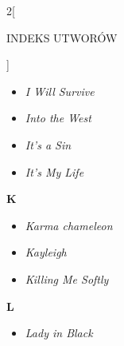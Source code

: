 \documentclass[a4paper]{report}
\begin{document}
\begin{multicols*}{2}[\begin{Huge}INDEKS UTWORÓW\end{Huge}\vspace{1cm}]
\begin{minipage}{\columnwidth}
\begin{itemize}[topsep=6pt, after=\vspace{1.5mm}, leftmargin=0mm]
		\itemsep0em
		\item[]  \textit{I Will Survive}  \\
	\end{itemize}
\end{minipage}
\begin{minipage}{\columnwidth}
	\begin{itemize}[topsep=6pt, after=\vspace{1.5mm}, leftmargin=0mm]
		\itemsep0em
		\item[]  \textit{Into the West}  \\
	\end{itemize}
\end{minipage}
\begin{minipage}{\columnwidth}
	\begin{itemize}[topsep=6pt, after=\vspace{5mm}, leftmargin=0mm]
		\itemsep0em
		\item[]  \textit{It's a Sin}  \\
		\item[]  \textit{It's My Life}  \\
	\end{itemize}
\end{minipage}
\begin{minipage}{\columnwidth}
\begin{Large}
		\textbf{K}
	\end{Large} 
	\begin{itemize}[topsep=6pt, after=\vspace{5mm}, leftmargin=0mm]
		\itemsep0em
		\item[]\textit{Karma chameleon}  \\
		\item[]  \textit{Kayleigh}  \\
		\item[]  \textit{Killing Me Softly}  \\
	\end{itemize}
\end{minipage}
\begin{minipage}{\columnwidth}
\begin{Large}
		\textbf{L}
	\end{Large} 
	\begin{itemize}[topsep=6pt, after=\vspace{1.5mm}, leftmargin=0mm]
		\itemsep0em
		\item[]\textit{Lady in Black}  \\

\end{itemize}
\end{minipage}
\end{multicols*}
\end{document}
